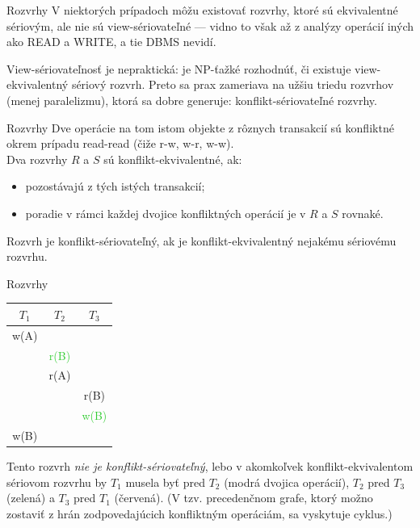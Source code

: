 \documentclass[12pt]{beamer}
\def\blue#1{\textcolor{Cerulean}{#1}}
\def\green#1{\textcolor{LimeGreen}{#1}}
\begin{document}
\begin{frame}[fragile]{Rozvrhy}
V niektorých prípadoch môžu existovať rozvrhy, ktoré sú ekvivalentné sériovým,
ale nie sú view-sériovateľné --- vidno to však až z analýzy operácií iných ako READ a WRITE, a tie DBMS nevidí.

View-sériovateľnosť je nepraktická: je NP-ťažké rozhodnúť, či existuje view-ekvivalentný sériový rozvrh.
Preto sa prax zameriava na užšiu triedu rozvrhov (menej paralelizmu),
ktorá sa dobre generuje: \alert{konflikt-sériovateľné} rozvrhy.
\end{frame}


\begin{frame}[fragile]{Rozvrhy}
Dve operácie na tom istom objekte z rôznych transakcií sú \alert{konfliktné} okrem prípadu read-read (čiže r-w, w-r, w-w).\\
Dva rozvrhy $R$ a $S$ sú \alert{konflikt-ekvivalentné}, ak:
\begin{itemize}
\item pozostávajú z tých istých transakcií;
\item poradie v rámci každej dvojice konfliktných operácií je v $R$ a $S$ rovnaké.
\end{itemize}
Rozvrh je \alert{konflikt-sériovateľný}, ak je konflikt-ekvivalentný nejakému sériovému rozvrhu.
\end{frame}


\begin{frame}[fragile]{Rozvrhy}
\begin{minipage}{.4\pdfpagewidth}
\begin{tabular}{c|c|c}
  $T_1$         & $T_2$         & $T_3$           \\\hline\hline
  \blue{w(A)}   &               &                 \\\hline
                & \green{r(B)}  &                 \\\hline
                & \blue{r(A)}   &                 \\\hline
                &               &  \alert{r(B)}   \\\hline
                &               &  \green{w(B)}   \\\hline
  \alert{w(B)}  &               &                 \\
\end{tabular}
\end{minipage}
\begin{minipage}{.4\pdfpagewidth}
Tento rozvrh \emph{nie je konflikt-sériovateľný}, lebo v akomkoľvek konflikt-ekvivalentom sériovom rozvrhu
by $T_1$ musela byť pred $T_2$ (modrá dvojica operácií), $T_2$ pred $T_3$ (zelená) a $T_3$ pred $T_1$ (červená).
(V tzv. precedenčnom grafe, ktorý možno zostaviť z hrán zodpovedajúcich konfliktným operáciám, sa vyskytuje cyklus.)
\end{minipage}
\\[5mm]
\end{frame}
\end{document}
